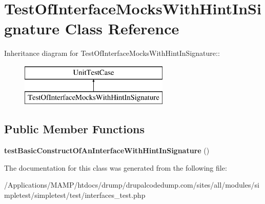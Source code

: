\hypertarget{class_test_of_interface_mocks_with_hint_in_signature}{
\section{TestOfInterfaceMocksWithHintInSignature Class Reference}
\label{class_test_of_interface_mocks_with_hint_in_signature}
}
Inheritance diagram for TestOfInterfaceMocksWithHintInSignature::\begin{figure}[H]
\begin{center}
\leavevmode
\includegraphics[height=2cm]{class_test_of_interface_mocks_with_hint_in_signature}
\end{center}
\end{figure}
\subsection*{Public Member Functions}
\begin{DoxyCompactItemize}
\item 
\hypertarget{class_test_of_interface_mocks_with_hint_in_signature_af1b87cd488baedf5c67900ba1331001e}{
{\bfseries testBasicConstructOfAnInterfaceWithHintInSignature} ()}
\label{class_test_of_interface_mocks_with_hint_in_signature_af1b87cd488baedf5c67900ba1331001e}

\end{DoxyCompactItemize}


The documentation for this class was generated from the following file:\begin{DoxyCompactItemize}
\item 
/Applications/MAMP/htdocs/drump/drupalcodedump.com/sites/all/modules/simpletest/simpletest/test/interfaces\_\-test.php\end{DoxyCompactItemize}
